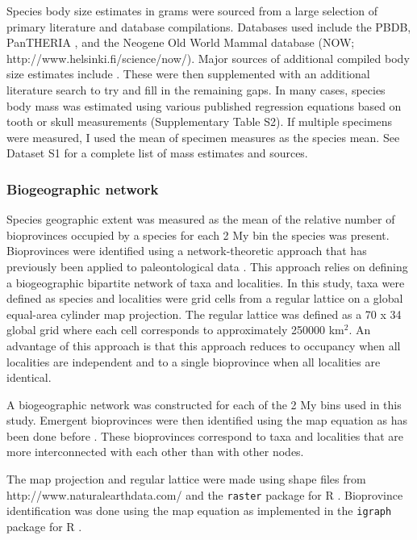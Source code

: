 Species body size estimates in grams were sourced from a large selection of primary literature and database compilations. Databases used include the PBDB, PanTHERIA \cite{Jones2009c}, and the Neogene Old World Mammal database (NOW; http://www.helsinki.fi/science/now/). Major sources of additional compiled body size estimates include \cite{Tomiya2013,Brook2004a,Freudenthal2013,McKenna2011,Raia2012f,Smith2004c}. These were then supplemented with an additional literature search to try and fill in the remaining gaps. In many cases, species body mass was estimated using various published regression equations based on tooth or skull measurements (Supplementary Table S2). If multiple specimens were measured, I used the mean of specimen measures as the species mean. See Dataset S1 for a complete list of mass estimates and sources.

\subsubsection{Biogeographic network}
Species geographic extent was measured as the mean of the relative number of bioprovinces occupied by a species for each 2 My bin the species was present. Bioprovinces were identified using a network-theoretic approach that has previously been applied to paleontological data \cite{Sidor2013,Vilhena2013}. This approach relies on defining a biogeographic bipartite network of taxa and localities. In this study, taxa were defined as species and localities were grid cells from a regular lattice on a global equal-area cylinder map projection. The regular lattice was defined as a 70 x 34 global grid where each cell corresponds to approximately 250000 km\(^{2}\). An advantage of this approach is that this approach reduces to occupancy when all localities are independent and to a single bioprovince when all localities are identical.

A biogeographic network was constructed for each of the 2 My bins used in this study. Emergent bioprovinces were then identified using the map equation \cite{Rosvall2008,Rosvall2009a} as has been done before \cite{Sidor2013,Vilhena2013b,Vilhena2013}. These bioprovinces correspond to taxa and localities that are more interconnected with each other than with other nodes.

The map projection and regular lattice were made using shape files from http://www.naturalearthdata.com/ and the \texttt{raster} package for R \cite{raster}. Bioprovince identification was done using the map equation as implemented in the \texttt{igraph} package for R \cite{csardi2006igraph}.



